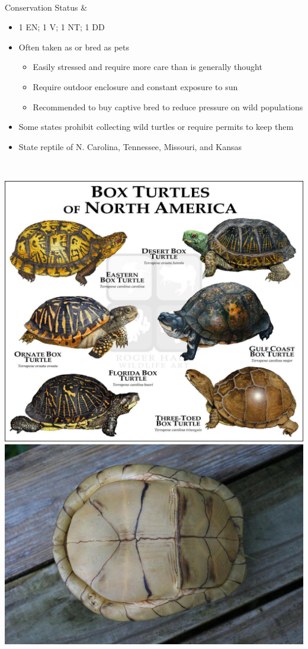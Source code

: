 \begin{center}
\begin{longtabu}
	\\
	\hline
	Conservation Status & 
	\begin{itemize}[noitemsep]
	\item 1 EN; 1 V; 1 NT; 1 DD
	\item Often taken as or bred as pets
		\begin{itemize}[noitemsep]
			\item Easily stressed and require more care than is generally thought
			\item Require outdoor enclosure and constant exposure to sun
			\item Recommended to buy captive bred to reduce pressure on wild populations
		\end{itemize}
	\item Some states prohibit collecting wild turtles or require permits to keep them
	\item State reptile of N. Carolina, Tennessee, Missouri, and Kansas
	\end{itemize}
	\\
	\hline
\end{longtabu}
\includegraphics{testudines/emydidae/terrapene/box} 
\includegraphics[scale=0.45]{testudines/emydidae/terrapene/plastron} 
\end{center}